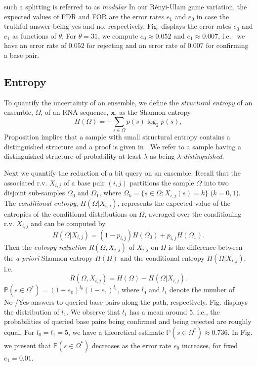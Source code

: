 \documentclass[preprint,authoryear]{elsarticle}
\begin{document}
such a splitting is referred to as \emph{modular}
In our R\'{e}nyi-Ulam game variation, the expected values of FDR and FOR are the error rates $e_1$
and $e_0$ in case the truthful answer being yes and no, respectively.
Fig. displays the error rates $e_0$ and $e_1$ as functions of $\theta$.
For $\theta=31$, we compute $e_0\approx 0.052$ and $e_1 \approx 0.007$, i.e. ~we have an error rate
of $ 0.052$ for rejecting and an error rate of $0.007$ for confirming a base pair.
\subsection{Entropy}
To quantify the uncertainty of an ensemble, we define 
the \emph{structural entropy} of an ensemble, $\Omega$, of an RNA sequence, $\mathbf{x}$,
as the Shannon entropy
\begin{equation*}
H(\Omega) = -\sum_{s\in \Omega} p(s) \log_2 p(s),
\end{equation*}
Proposition implies that a sample with small structural entropy contains a
distinguished structure and a proof is given in .
We refer to a sample having a distinguished structure of probability at least $\lambda$ as
being \emph{$\lambda$-distinguished}.
   
Next we quantify the reduction of a bit query on an ensemble.
Recall that the associated r.v. $X_{i,j}$  of a base pair $(i,j)$ 
partitions the sample $\Omega$ into two disjoint sub-samples $\Omega_0$ and
$\Omega_1$, where  $ \Omega_k=\{s\in  \Omega :X_{i,j}(s)=k\}$ ($k=0,1$).
The \emph{conditional entropy}, $H(\Omega|X_{i,j})$,  
represents 
the expected value of the entropies of the conditional distributions on $\Omega$,
averaged over the conditioning r.v. $X_{i,j}$ and can be
computed by 
\begin{equation*}
H(\Omega|X_{i,j})= (1-p_{i,j}) H(\Omega_0)+ p_{i,j} H(\Omega_1).
\end{equation*}
Then the \emph{entropy reduction} $R(\Omega,X_{i,j})$ of  $X_{i,j}$ on $\Omega$ 
is the difference between the \textit{a priori} Shannon entropy $H(\Omega)$ and the conditional
entropy $H(\Omega|X_{i,j}) $, i.e. 
\begin{equation*}
R(\Omega,X_{i,j})= H(\Omega)-H(\Omega|X_{i,j}). 
\end{equation*}
$\mathbb{P}(s\in \Omega^* )=(1-e_0)^{l_0} (1-e_1)^{l_1}$,
where $l_0$ and  $l_1$ denote the number of No-/Yes-answers to queried base pairs along the path,
respectively.  
Fig. displays the distribution of $l_1$. We observe that $l_1$ has
a mean around $5$,
i.e., the probabilities of queried base pairs being confirmed and being rejected
are roughly equal.
For $l_0=l_1=5$,  we have a theoretical estimate  $\mathbb{P}(s\in \Omega^* )\approx 0.736$.
In Fig.  we present  that $\mathbb{P}(s\in \Omega^* )$ decreases 
as  the error rate $e_0$ increases, for fixed $e_1=0.01$.
\end{document}
